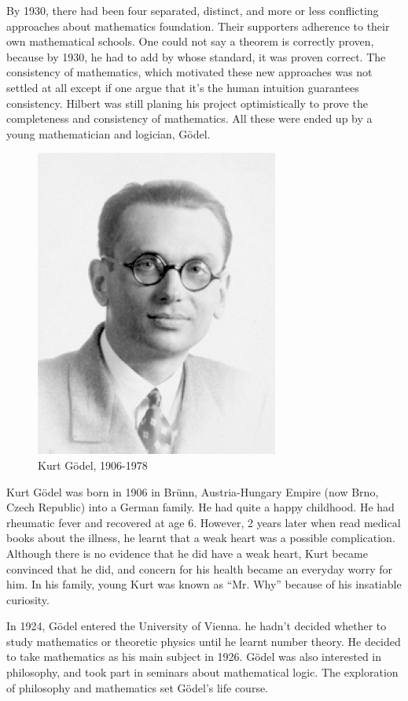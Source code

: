 \documentclass{article}
\begin{document}
By 1930, there had been four separated, distinct, and more or less conflicting approaches about mathematics foundation. Their supporters adherence to their own mathematical schools. One could not say a theorem is correctly proven, because by 1930, he had to add by whose standard, it was proven correct. The consistency of mathematics, which motivated these new approaches was not settled at all except if one argue that it's the human intuition guarantees consistency\cite{M-Kline-2007}. Hilbert was still planing his project optimistically to prove the completeness and consistency of mathematics. All these were ended up by a young mathematician and logician, Gödel.

\begin{figure}
 \centering
 \includegraphics[scale=0.8]{img/Godel-young.png}
 \captionsetup{labelformat=empty}
 \caption{Kurt Gödel, 1906-1978}
 \label{fig:Godel-young}
\end{figure}

Kurt Gödel was born in 1906 in Brünn, Austria-Hungary Empire (now Brno, Czech Republic) into a German family. He had quite a happy childhood. He had rheumatic fever and recovered at age 6. However, 2 years later when read medical books about the illness, he learnt that a weak heart was a possible complication. Although there is no evidence that he did have a weak heart, Kurt became convinced that he did, and concern for his health became an everyday worry for him. In his family, young Kurt was known as ``Mr. Why'' because of his insatiable curiosity.

In 1924, Gödel entered the University of Vienna. he hadn't decided whether to study mathematics or theoretic physics until he learnt number theory. He decided to take mathematics as his main subject in 1926. Gödel was also interested in philosophy, and took part in seminars about mathematical logic. The exploration of philosophy and mathematics set Gödel's life course.
\end{document}
